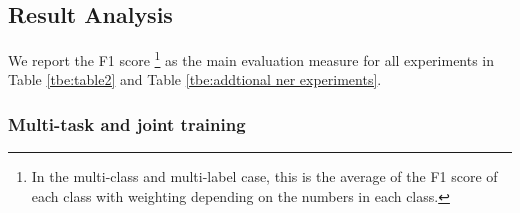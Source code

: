 \subsection{Result Analysis}
We report the F1 score \footnote{In the multi-class and multi-label case, this
is the average of the F1 score of each class with weighting depending on the
numbers in each class.} as the main evaluation measure for all experiments in
Table \ref{tbe:table2} and Table \ref{tbe:addtional ner experiments}.

\subsubsection*{Multi-task and joint training} 
\begin{table}
  \begin{centering}
  \end{centering}

  \caption{
    F1 scores for joint sentence classification and NER training. 
    We iterate various sample number per intent and test on original test set.
  }
  \label{tbe:addtional ner experiments}
\end{table}

